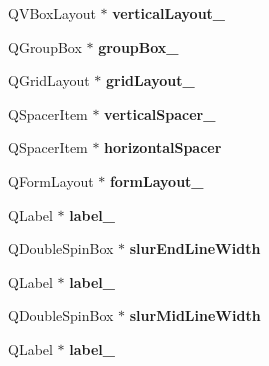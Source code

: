 \begin{DoxyCompactItemize}
Q\+V\+Box\+Layout $\ast$ {\bfseries vertical\+Layout\+\_}
\item 
\mbox{\label{class_ui___edit_style_base_a09d2e0a41edfe26de1b89d6e1865d7f9}} 
Q\+Group\+Box $\ast$ {\bfseries group\+Box\+\_}
\item 
\mbox{\label{class_ui___edit_style_base_a8478cc966d4e7bab8c365065b9ca36b3}} 
Q\+Grid\+Layout $\ast$ {\bfseries grid\+Layout\+\_}
\item 
\mbox{\label{class_ui___edit_style_base_ac68f0e34f61875f33c921eb747b72fd2}} 
Q\+Spacer\+Item $\ast$ {\bfseries vertical\+Spacer\+\_}
\item 
\mbox{\label{class_ui___edit_style_base_a02d60d4aa829d26f90928161801d056b}} 
Q\+Spacer\+Item $\ast$ {\bfseries horizontal\+Spacer}
\item 
\mbox{\label{class_ui___edit_style_base_adc8fbbffcda48a2fb9b692adab7a3b4b}} 
Q\+Form\+Layout $\ast$ {\bfseries form\+Layout\+\_}
\item 
\mbox{\label{class_ui___edit_style_base_a8adedff36e79df6e7af9b7bf382bd4ce}} 
Q\+Label $\ast$ {\bfseries label\+\_}
\item 
\mbox{\label{class_ui___edit_style_base_acddc5f7d574513136087fe1dceac1791}} 
Q\+Double\+Spin\+Box $\ast$ {\bfseries slur\+End\+Line\+Width}
\item 
\mbox{\label{class_ui___edit_style_base_a102dda4f2476ce80e061bc6a278b3c37}} 
Q\+Label $\ast$ {\bfseries label\+\_}
\item 
\mbox{\label{class_ui___edit_style_base_ae50aada5cdea6f8097813e95ebc456c3}} 
Q\+Double\+Spin\+Box $\ast$ {\bfseries slur\+Mid\+Line\+Width}
\item 
\mbox{\label{class_ui___edit_style_base_ab8baef90b32a35ee4b2f351e0055196c}} 
Q\+Label $\ast$ {\bfseries label\+\_}
\item 

\end{DoxyCompactItemize}
